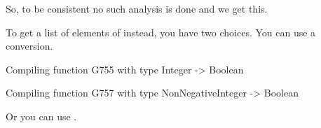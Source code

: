 \begin{xtc}
\begin{xtccomment}
So, to be consistent no such analysis is done and we get this.
\end{xtccomment}
\begin{spadsrc}
[10^(i-1) for i in 2..5]
\end{spadsrc}
\begin{TeXOutput}
\begin{fricasmath}{10}
%
\end{fricasmath}
\end{TeXOutput}
\end{xtc}
\begin{xtc}
\begin{xtccomment}
To get a list of elements of  instead, you
have two choices.
You can use a conversion.
\end{xtccomment}
\begin{spadsrc}
[10^((i-1) :: PI) for i in 2..5]
\end{spadsrc}
\begin{MessageOutput}
   Compiling function G755 with type Integer -> Boolean 
\end{MessageOutput}
\begin{MessageOutput}
   Compiling function G757 with type NonNegativeInteger -> Boolean 
\end{MessageOutput}
\begin{TeXOutput}
\begin{fricasmath}{11}
%
\end{fricasmath}
\end{TeXOutput}
\end{xtc}
\begin{xtc}
\begin{xtccomment}
Or you can use .
\end{xtccomment}
\begin{spadsrc}
\end{spadsrc}
\begin{TeXOutput}
\begin{fricasmath}{12}
%
\end{fricasmath}
\end{TeXOutput}
\end{xtc}


